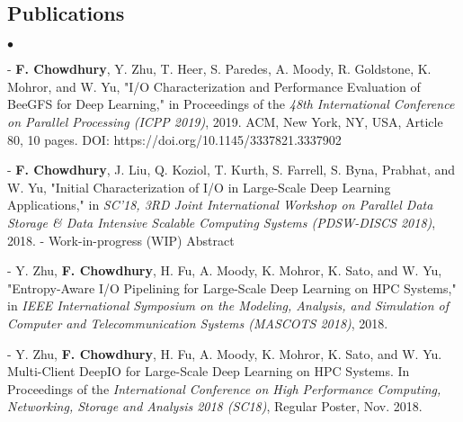 \documentclass[margin,line]{res}
\newenvironment{list2}{
  \begin{list}{$\bullet$}{%
      \setlength{\itemsep}{0in}
      \setlength{\parsep}{0in} \setlength{\parskip}{0in}
      \setlength{\topsep}{0in} \setlength{\partopsep}{0in} 
      \setlength{\leftmargin}{0.2in}}}{\end{list}}
\begin{document}
\begin{resume}
\vspace*{-.1in}

\section{\sc Publications}
\begin{list2}
\item[ -  ] {\bf F. Chowdhury}, Y. Zhu, T. Heer, S. Paredes, A. Moody, R. Goldstone, K. Mohror, and W. Yu, "I/O Characterization and Performance Evaluation of BeeGFS for Deep Learning," in Proceedings of the \textit{48th International Conference on Parallel Processing (ICPP 2019)}, 2019. ACM, New York, NY, USA, Article 80, 10 pages. DOI: https://doi.org/10.1145/3337821.3337902
\item[ - ] {\bf F. Chowdhury}, J. Liu, Q. Koziol, T. Kurth, S. Farrell, S. Byna, Prabhat, and W. Yu, "Initial Characterization of I/O in Large-Scale Deep Learning Applications," in \textit{SC'18, 3RD Joint International Workshop on Parallel Data Storage \& Data Intensive Scalable Computing Systems (PDSW-DISCS 2018)}, 2018. - Work-in-progress (WIP) Abstract
\item[ - ] Y. Zhu, {\bf F. Chowdhury}, H. Fu, A. Moody, K. Mohror, K. Sato, and W. Yu, "Entropy-Aware I/O Pipelining for Large-Scale Deep Learning on HPC Systems," in \textit{IEEE International Symposium on the Modeling, Analysis, and Simulation of Computer and Telecommunication Systems (MASCOTS 2018)}, 2018.
\item[ - ] Y. Zhu, {\bf F. Chowdhury}, H. Fu, A. Moody, K. Mohror, K. Sato, and W. Yu. Multi-Client DeepIO for Large-Scale Deep Learning on HPC Systems. In Proceedings of the \textit{International Conference on High Performance Computing, Networking, Storage and Analysis 2018 (SC18)}, Regular Poster, Nov. 2018.

\end{list2}

\vspace*{-.1in}


\end{resume}
\end{document}
